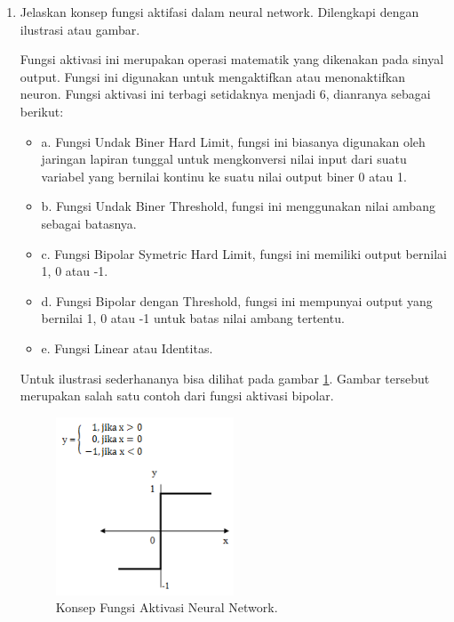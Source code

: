 \begin{enumerate}
\item Jelaskan konsep fungsi aktifasi dalam neural network. Dilengkapi dengan ilustrasi atau gambar. \par
Fungsi aktivasi ini merupakan operasi matematik yang dikenakan pada sinyal output. Fungsi ini digunakan untuk mengaktifkan atau menonaktifkan neuron. Fungsi aktivasi ini terbagi setidaknya menjadi 6, dianranya sebagai berikut:
\begin{itemize}
\item a. Fungsi Undak Biner Hard Limit, fungsi ini biasanya digunakan oleh jaringan lapiran tunggal untuk mengkonversi nilai input dari suatu variabel yang bernilai kontinu ke suatu nilai output biner 0 atau 1.
\item b. Fungsi Undak Biner Threshold, fungsi ini menggunakan nilai ambang sebagai batasnya.
\item c. Fungsi Bipolar Symetric Hard Limit, fungsi ini memiliki output bernilai 1, 0 atau -1.
\item d. Fungsi Bipolar dengan Threshold, fungsi ini mempunyai output yang bernilai 1, 0 atau -1 untuk batas nilai ambang tertentu.
\item e. Fungsi Linear atau Identitas.
\end{itemize}
Untuk ilustrasi sederhananya bisa dilihat pada gambar \ref{cc4}. Gambar tersebut merupakan salah satu contoh dari fungsi aktivasi bipolar.
		\begin{figure}[!htbp]
		\centerline{\includegraphics[width=0.5\textwidth]{figures/im/cc4.png}}
		\caption{Konsep Fungsi Aktivasi Neural Network.}
		\label{cc4}
		\end{figure}


\end{enumerate}
